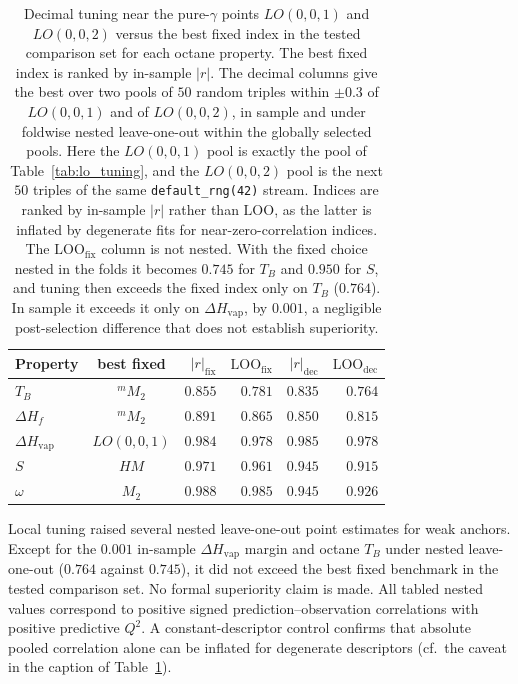 \documentclass[a5paper, 10pt]{article}
\theoremstyle{plain}
\theoremstyle{remark}
\theoremstyle{definition}
\begin{document}
\begin{table}[H]
\centering
\caption{Decimal tuning near the pure-$\gamma$ points $LO(0,0,1)$ and $LO(0,0,2)$ versus the best fixed index in the tested comparison set for each octane property. The best fixed index is ranked by in-sample $|r|$. The decimal columns give the best over two pools of $50$ random triples within $\pm 0.3$ of $LO(0,0,1)$ and of $LO(0,0,2)$, in sample and under foldwise nested leave-one-out within the globally selected pools. Here the $LO(0,0,1)$ pool is exactly the pool of Table~\ref{tab:lo_tuning}, and the $LO(0,0,2)$ pool is the next $50$ triples of the same \texttt{default\_rng(42)} stream. Indices are ranked by in-sample $|r|$ rather than $\mathrm{LOO}$, as the latter is inflated by degenerate fits for near-zero-correlation indices. The $\mathrm{LOO}_{\mathrm{fix}}$ column is not nested. With the fixed choice nested in the folds it becomes $0.745$ for $T_B$ and $0.950$ for $S$, and tuning then exceeds the fixed index only on $T_B$ ($0.764$). In sample it exceeds it only on $\Delta H_{\mathrm{vap}}$, by $0.001$, a negligible post-selection difference that does not establish superiority.}
\label{tab:lo_tuning_bestfixed}
\small
\begin{tabular}{lcrrrr}
\toprule
Property & best fixed & $|r|_{\mathrm{fix}}$ & $\mathrm{LOO}_{\mathrm{fix}}$ & $|r|_{\mathrm{dec}}$ & $\mathrm{LOO}_{\mathrm{dec}}$\\
\midrule
$T_B$ & ${}^{m}\!M_2$ & $0.855$ & $0.781$ & $0.835$ & $0.764$\\
$\Delta H_f$ & ${}^{m}\!M_2$ & $0.891$ & $0.865$ & $0.850$ & $0.815$\\
$\Delta H_{\mathrm{vap}}$ & $LO(0,0,1)$ & $0.984$ & $0.978$ & $0.985$ & $0.978$\\
$S$ & $HM$ & $0.971$ & $0.961$ & $0.945$ & $0.915$\\
$\omega$ & $M_2$ & $0.988$ & $0.985$ & $0.945$ & $0.926$\\
\bottomrule
\end{tabular}
\end{table}

Local tuning raised several nested leave-one-out point
estimates for weak anchors. Except for the $0.001$ in-sample $\Delta H_{\mathrm{vap}}$ margin and octane $T_B$ under nested leave-one-out ($0.764$ against $0.745$), it did not exceed the best fixed benchmark in the tested comparison set. No formal
superiority claim is made. All tabled nested values correspond to
positive signed prediction--observation correlations with positive
predictive $Q^{2}$. A constant-descriptor control confirms that
absolute pooled correlation alone can be inflated for degenerate
descriptors (cf.\ the caveat in the caption of
Table~\ref{tab:lo_tuning_bestfixed}).
\end{document}
